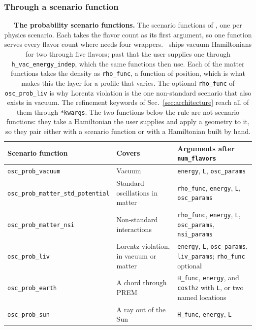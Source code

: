 \subsubsection{Through a scenario function}

{\def\arraystretch{1.2}
\begin{table}[t!]
{\footnotesize
\begin{tabular}{@{}p{5.0cm}p{4.4cm}p{7.4cm}@{}}
 Scenario function & Covers & Arguments after {\tt num\_flavors} \\
 \hline
 {\tt osc\_prob\_vacuum} & Vacuum & {\tt energy}, {\tt L}, {\tt osc\_params} \\
 {\tt osc\_prob\_matter\_std\_potential} & Standard oscillations in matter & {\tt rho\_func}, {\tt energy}, {\tt L}, {\tt osc\_params} \\
 {\tt osc\_prob\_matter\_nsi} & Non-standard interactions & {\tt rho\_func}, {\tt energy}, {\tt L}, {\tt osc\_params}, {\tt nsi\_params} \\
 {\tt osc\_prob\_liv} & Lorentz violation, in vacuum or matter & {\tt energy}, {\tt L}, {\tt osc\_params}, {\tt liv\_params}; {\tt rho\_func} optional \\
 \hline
 {\tt osc\_prob\_earth} & A chord through PREM & {\tt H\_func}, {\tt energy}, and {\tt costhz} with {\tt L}, or two named locations \\
 {\tt osc\_prob\_sun} & A ray out of the Sun & {\tt H\_func}, {\tt energy}, {\tt L} \\
\end{tabular}}
\caption{\label{tab:scenarios}\textbf{The probability scenario functions.} The scenario functions of \magnus, one per physics scenario. Each takes the flavor count as its first argument, so one function serves every flavor count where  needs four wrappers. \magnus\ ships vacuum Hamiltonians for two through five flavors; past that the user supplies one through {\tt h\_vac\_energy\_indep}, which the same functions then use. Each of the matter functions takes the density as {\tt rho\_func}, a function of position, which is what makes this the layer for a profile that varies. The optional {\tt rho\_func} of {\tt osc\_prob\_liv} is why Lorentz violation is the one non-standard scenario that also exists in vacuum. The refinement keywords of Sec.~\ref{sec:architecture} reach all of them through {\tt **kwargs}. The two functions below the rule are not scenario functions: they take a Hamiltonian the user supplies and apply a geometry to it, so they pair either with a scenario function or with a Hamiltonian built by hand.}
\end{table}}

